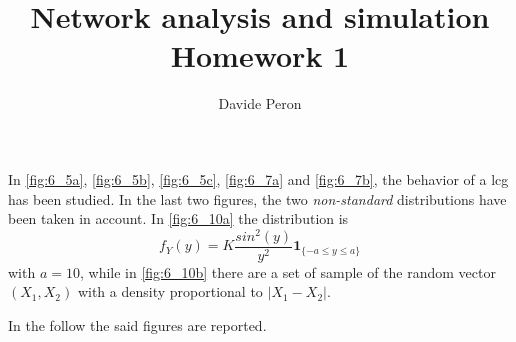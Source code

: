 \documentclass[11pt,a4paper]{article}
\title{\blue Network analysis and simulation\\ Homework 1}
\author{Davide Peron}
\date{}
\begin{document}
\maketitle
\section{}
In \autoref{fig:6_5a}, \autoref{fig:6_5b}, \autoref{fig:6_5c}, \autoref{fig:6_7a} and \autoref{fig:6_7b}, the behavior of a \gls{lcg} has been studied. In the last two figures, the two \textit{non-standard} distributions have been taken in account. In \autoref{fig:6_10a} the distribution is
$$
f_Y(y) = K\frac{sin^2(y)}{y^2}\mathbf{1}_{\{-a \le y \le a\}}
$$
with $a=10$, while in \autoref{fig:6_10b} there are a set of sample of the random vector $(X_1, X_2)$ with a density proportional to $|X_1 - X_2|$.

In the follow the said figures are reported.
\end{document}
